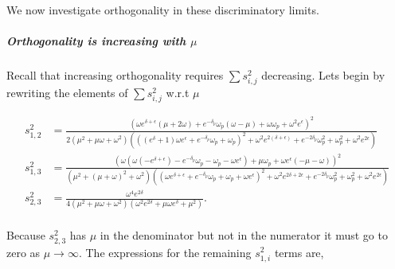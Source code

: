 We now investigate orthogonality in these discriminatory limits.

\subparagraph{Orthogonality is increasing with $\mu$}
Recall that increasing orthogonality requires $\sum s^2_{i,j}$ decreasing.  Lets begin by rewriting the elements of $\sum{s^2_{i,j}}$ w.r.t $\mu$
\begin{widetext}
\begin{eqnarray*}
s^2_{1,2}&=\frac{\left(\omega  e^{\delta +\epsilon } (\mu +2 \omega )+e^{-\delta_p} \omega_p(\omega -\mu )+\omega  \omega_p+\omega ^2 e^{\epsilon }\right)^2}{2 \left(\mu ^2+\mu  \omega +\omega ^2\right) \left(\left(\left(e^{\delta }+1\right) \omega  e^{\epsilon }+e^{-\delta_p} \omega_p+\omega_p\right)^2+\omega ^2 e^{2 (\delta +\epsilon )}+e^{-2 \delta_p} \omega_p^2+\omega_p^2+\omega ^2 e^{2 \epsilon }\right)}\\
s^2_{1,3}&=\frac{\left(\omega  \left(\omega  \left(-e^{\delta +\epsilon }\right)-e^{-\delta_p} \omega_p-\omega_p-\omega  e^{\epsilon }\right)+\mu  \omega_p+\omega  e^{\epsilon } (-\mu -\omega )\right)^2}{\left(\mu ^2+(\mu +\omega )^2+\omega ^2\right) \left(\left(\omega  e^{\delta +\epsilon }+e^{-\delta_p} \omega_p+\omega_p+\omega  e^{\epsilon }\right)^2+\omega ^2 e^{2 \delta +2 \epsilon }+e^{-2 \delta_p} \omega_p^2+\omega_p^2+\omega ^2 e^{2 \epsilon }\right)}\\
s^2_{2,3}&=\frac{\omega ^4 e^{2 \delta }}{4 \left(\mu ^2+\mu  \omega +\omega ^2\right) \left(\omega ^2 e^{2 \delta }+\mu  \omega  e^{\delta }+\mu ^2\right)}.\\
\end{eqnarray*}
\end{widetext}
Because $s^2_{2,3}$  has $\mu$ in the denominator but not in the numerator it must go to zero as $\mu\to\infty$.  The expressions for the remaining $s^2_{1,i}$ terms are,

